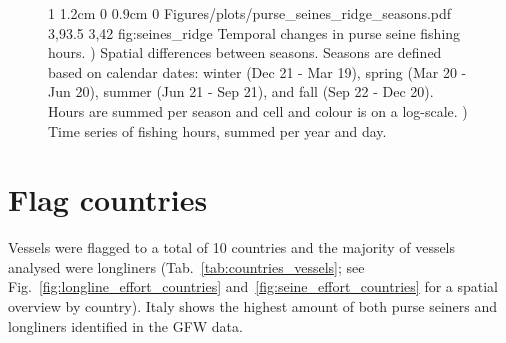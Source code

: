 \begin{figure}[ht]
	{1\linewidth}
	{1.2cm 0 0.9cm 0}                       %
	{Figures/plots/purse_seines_ridge_seasons.pdf} %
	{3,93.5}                                  %
	{3,42}                                  %
	{fig:seines_ridge}
	{%
		Temporal changes in purse seine fishing hours. ) Spatial differences between seasons. Seasons are defined based on calendar dates:
		winter (Dec 21 - Mar 19), spring (Mar 20 - Jun 20), summer (Jun 21 - Sep 21), and fall (Sep 22 - Dec 20).
		Hours are summed per season and cell and colour is on a log-scale. ) Time series of fishing hours, summed per year
		and day.}
\end{figure}

\FloatBarrier
\section{Flag countries}

Vessels were flagged to a total of 10 countries and the majority of vessels analysed were
longliners (Tab.~\ref{tab:countries_vessels}; see Fig.~\ref{fig:longline_effort_countries}
and~\ref{fig:seine_effort_countries} for a spatial overview by country). Italy shows the highest
amount of both purse seiners and longliners identified in the GFW data.

\medskip

